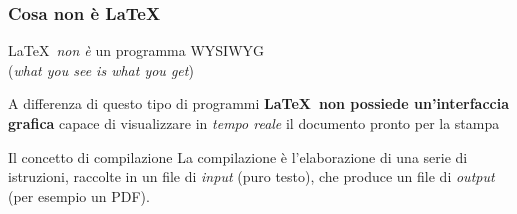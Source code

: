 \documentclass[svgnames,%
	ucs,%
	pdftex]{guitbeamer}
\begin{document}
\begin{frame}
  \frametitle{Cosa non \`e \LaTeX}
	\begin{center}
	\LaTeX\ \emph{non \`e} un programma WYSIWYG\\
	(\textit{what you see is what you get})
	\end{center}
  \bigskip
	A differenza di questo tipo di programmi \textbf{\LaTeX\ non
	possiede un'interfaccia grafica} capace di visualizzare in
	\emph{tempo reale} il documento pronto per la stampa\\
  \bigskip
	\begin{block}{Il concetto di compilazione} 
		La compilazione \`e l'elaborazione di una serie di istruzioni, raccolte in un file di   \emph{input} (puro testo), che produce un file di \emph{output} (per esempio un PDF).
	\end{block}
\end{frame}
\end{document}
